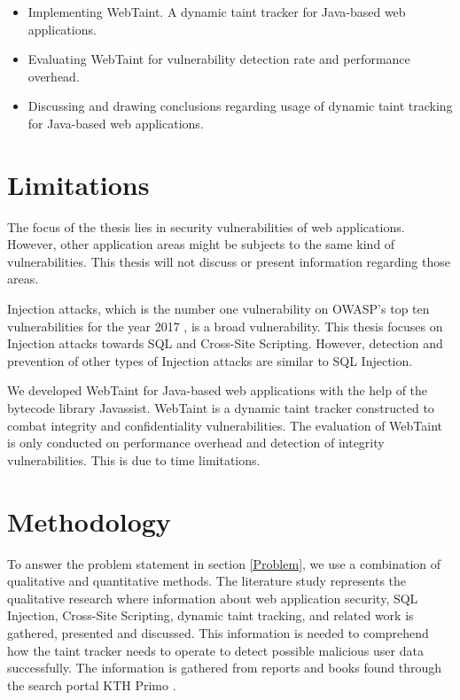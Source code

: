 \begin{itemize}  
    \item Implementing WebTaint. A dynamic taint tracker for Java-based web applications.
    \item Evaluating WebTaint for vulnerability detection rate and performance overhead.
    \item Discussing and drawing conclusions regarding usage of dynamic taint tracking for Java-based web applications.
\end{itemize}



\section{Limitations}
\label{Delimitations}
The focus of the thesis lies in security vulnerabilities of web applications. However, other application areas might be subjects to the same kind of vulnerabilities. This thesis will not discuss or present information regarding those areas. 

Injection attacks, which is the number one vulnerability on OWASP's top ten vulnerabilities for the year 2017 \parencite{OWASP2017}, is a broad vulnerability. This thesis focuses on Injection attacks towards SQL and Cross-Site Scripting. However, detection and prevention of other types of Injection attacks are similar to SQL Injection.

We developed WebTaint for Java-based web applications with the help of the bytecode library Javassist. WebTaint is a dynamic taint tracker constructed to combat integrity and confidentiality vulnerabilities. The evaluation of WebTaint is only conducted on performance overhead and detection of integrity vulnerabilities. This is due to time limitations.



\section{Methodology}
\label{Methodology}
To answer the problem statement in section \ref{Problem}, we use a combination of qualitative and quantitative methods. The literature study represents the qualitative research where information about web application security, SQL Injection, Cross-Site Scripting, dynamic taint tracking, and related work is gathered, presented and discussed. This information is needed to comprehend how the taint tracker needs to operate to detect possible malicious user data successfully. The information is gathered from reports and books found through the search portal KTH Primo \parencite{primo}.

